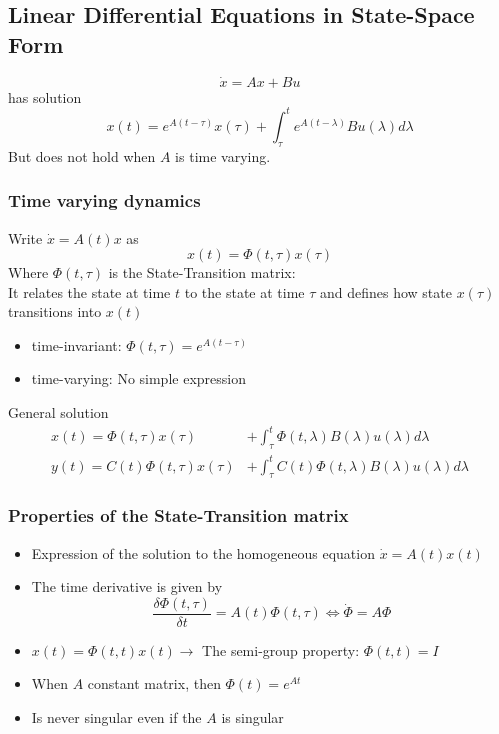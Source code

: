 \subsection{Linear Differential Equations in State-Space Form}%
\label{dls:sub:linear_differential_equations_in_state_space_form}
\[\dot{x} = Ax + Bu\]
has solution 
\[x(t) = e^{A(t - \tau)} x(\tau) + \int_\tau^t e^{A(t - \lambda)} B u(\lambda) d\lambda\]
But does not hold when \(A\) is time varying.

\subsubsection{Time varying dynamics}%
\label{dls:ssub:time_varying_dynamics}
Write \(\dot{x} = A(t)x\) as
\[x(t) = \Phi(t,\tau)x(\tau)\]
Where \(\Phi(t,\tau)\) is the State-Transition matrix:\\
It relates the state at time \(t\) to the state at time \(\tau\) and defines how state \(x(\tau)\) transitions
into \(x(t)\)
\begin{itemize}
\item time-invariant: \(\Phi(t,\tau) = e^{A(t-\tau)}\)
\item time-varying: No simple expression
\end{itemize}
General solution
\begin{align*}
  x(t) = \Phi(t, \tau)x(\tau) &+ \int_\tau^t \Phi(t,\lambda)B(\lambda)u(\lambda)d\lambda\\
  y(t) = C(t)\Phi(t, \tau)x(\tau) &+ \int_\tau^t C(t) \Phi(t,\lambda)B(\lambda)u(\lambda)d\lambda
\end{align*}

\subsubsection{Properties of the State-Transition matrix}%
\label{dls:ssub:properties_of_the_state_transition_matrix}
\begin{itemize}
\item Expression of the solution to the homogeneous equation \(\dot{x} = A(t)x(t)\)
\item The time derivative is given by \[\frac{\delta\Phi(t,\tau)}{\delta t} = A(t)\Phi(t,\tau)
    \Leftrightarrow \dot{\Phi} = A \Phi\]
\item \(x(t) = \Phi(t,t) x(t) \rightarrow \) The semi-group property: \(\Phi(t,t) = I\)
\item When \(A\) constant matrix, then \(\Phi(t) = e^{At}\)
\item Is never singular even if the \(A\) is singular
\end{itemize}

